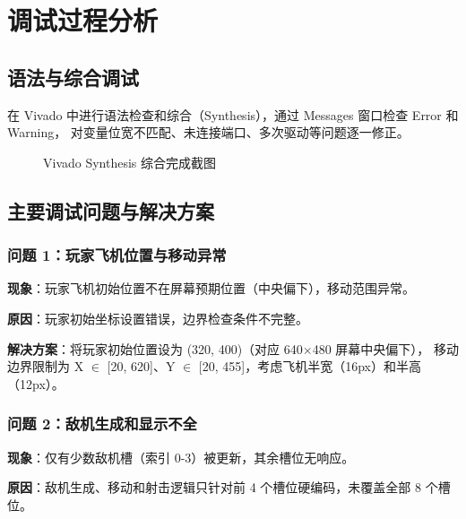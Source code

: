 \documentclass[12pt,a4paper]{ctexart}
\begin{document}
\section{调试过程分析}

\subsection{语法与综合调试}

在 Vivado 中进行语法检查和综合（Synthesis），通过 Messages 窗口检查 Error 和 Warning，
对变量位宽不匹配、未连接端口、多次驱动等问题逐一修正。

\begin{figure}[H]
\centering
\caption{Vivado Synthesis 综合完成截图}
\label{fig:synth}
\end{figure}

\subsection{主要调试问题与解决方案}

\subsubsection{问题 1：玩家飞机位置与移动异常}

\textbf{现象}：玩家飞机初始位置不在屏幕预期位置（中央偏下），移动范围异常。

\textbf{原因}：玩家初始坐标设置错误，边界检查条件不完整。

\textbf{解决方案}：将玩家初始位置设为 (320, 400)（对应 640$\times$480 屏幕中央偏下），
移动边界限制为 X $\in$ [20, 620]、Y $\in$ [20, 455]，考虑飞机半宽（16px）和半高（12px）。

\subsubsection{问题 2：敌机生成和显示不全}

\textbf{现象}：仅有少数敌机槽（索引 0-3）被更新，其余槽位无响应。

\textbf{原因}：敌机生成、移动和射击逻辑只针对前 4 个槽位硬编码，未覆盖全部 8 个槽位。
\end{document}
